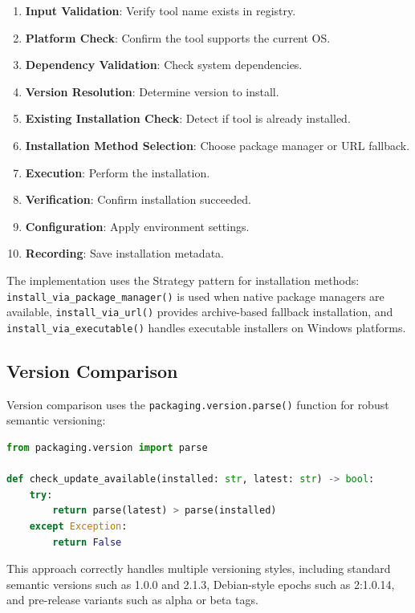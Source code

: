 \documentclass[12pt,a4paper]{report}
\begin{document}
\begin{enumerate}
    \item \textbf{Input Validation}: Verify tool name exists in registry.
    \item \textbf{Platform Check}: Confirm the tool supports the current OS.
    \item \textbf{Dependency Validation}: Check system dependencies.
    \item \textbf{Version Resolution}: Determine version to install.
    \item \textbf{Existing Installation Check}: Detect if tool is already installed.
    \item \textbf{Installation Method Selection}: Choose package manager or URL fallback.
    \item \textbf{Execution}: Perform the installation.
    \item \textbf{Verification}: Confirm installation succeeded.
    \item \textbf{Configuration}: Apply environment settings.
    \item \textbf{Recording}: Save installation metadata.
\end{enumerate}

The implementation uses the Strategy pattern for installation methods:
\texttt{install\_via\_package\_manager()} is used when native package managers are available, \texttt{install\_via\_url()} provides archive-based fallback installation, and \texttt{install\_via\_executable()} handles executable installers on Windows platforms.

\subsection{Version Comparison}
Version comparison uses the \texttt{packaging.version.parse()} function for robust semantic versioning:

\begin{lstlisting}[language=Python, caption={Version Comparison Logic}]
from packaging.version import parse

def check_update_available(installed: str, latest: str) -> bool:
    try:
        return parse(latest) > parse(installed)
    except Exception:
        return False
\end{lstlisting}

This approach correctly handles multiple versioning styles, including standard semantic versions such as 1.0.0 and 2.1.3, Debian-style epochs such as 2:1.0.14, and pre-release variants such as alpha or beta tags.
\end{document}
